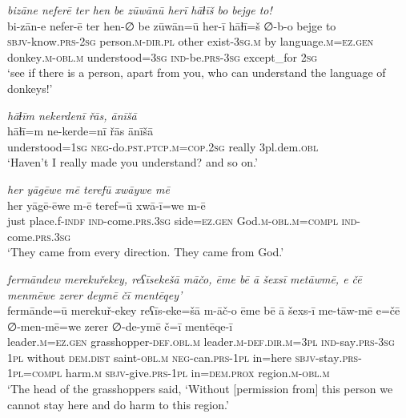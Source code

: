 \ea \label{HB.91}
\textit{bizāne neferē ter hen be zūwānū herī hāɫīš bo bejge to!} \\ 
\gll bi-zān-e nefer-ē ter hen-∅ be zūwān=ū her-ī hāɫī=š ∅-b-o bejge to \\ 
 \textsc{sbjv-}know\textsc{.prs}-\textsc{2sg} person\textsc{.m}\textsc{-dir}\textsc{.pl} other exist\textsc{-3sg}\textsc{.m} by language\textsc{.m}\textsc{=ez}\textsc{.gen} donkey\textsc{.m}\textsc{-obl}\textsc{.m} understood\textsc{=3sg} \textsc{ind-}be\textsc{.prs}\textsc{-3sg} except\_for \textsc{2sg} \\ 
\glt `see if there is a person, apart from you, who can understand the language of donkeys!'
\z 
 
\ea \label{HB.93}
\textit{hāɫīm nekerdenī řās, ānīšā} \\ 
\gll hāɫī=m ne-kerde=nī řās ānīšā \\ 
 understood\textsc{=1sg} \textsc{neg-}do\textsc{.pst}\textsc{.ptcp}\textsc{.m}\textsc{=cop}\textsc{.\textsc{2sg}} really 3pl.dem\textsc{.obl} \\ 
\glt `Haven’t I really made you understand? and so on.'
\z 


\ea \label{PM.3}
\textit{her yāgēwe mē terefū xwāywe mē} \\ 
\gll her yāgē-ēwe m-ē teref=ū xwā-ī=we m-ē \\ 
 just place.f\textsc{-indf} \textsc{ind-}come\textsc{.prs}\textsc{.3sg} side\textsc{\textsc{=ez.gen}} God\textsc{.m}\textsc{-obl}\textsc{.m}\textsc{=compl} \textsc{ind-}come\textsc{.prs}\textsc{.3sg} \\ 
\glt `They came from every direction. They came from God.'
\z 
 
\ea \label{PM.5}
\textit{fermāndew merekuřekey, reʕīsekešā māčo, ēme bē ā šexsī metāwmē, e čē menmēwe zerer deymē čī mentēqey’} \\ 
\gll fermānde=ū merekuř-ekey reʕīs-eke=šā m-āč-o ēme bē ā šexs-ī me-tāw-mē e=čē ∅-men-mē=we zerer ∅-de-ymē č=ī mentēqe-ī \\ 
 leader\textsc{.m}\textsc{\textsc{=ez.gen}} grasshopper\textsc{-def}\textsc{.obl}\textsc{.m} leader\textsc{.m}\textsc{-def}\textsc{.dir}\textsc{.m}\textsc{=3pl} \textsc{ind-}say\textsc{.prs}\textsc{-3sg} \textsc{1pl} without \textsc{dem.dist} saint\textsc{-obl}\textsc{.m} \textsc{neg-}can\textsc{.prs}\textsc{-1pl} in=here \textsc{sbjv-}stay\textsc{.prs}\textsc{-1pl}\textsc{=compl} harm\textsc{.m} \textsc{sbjv-}give\textsc{.prs}-\textsc{1pl} in=\textsc{dem.prox} region\textsc{.m}\textsc{-obl}\textsc{.m} \\ 
\glt `The head of the grasshoppers said, ‘Without [permission from] this person we cannot stay here and do harm to this region.'
\z 
 
